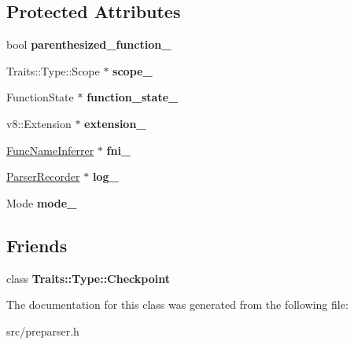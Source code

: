 \subsection*{Protected Attributes}
\begin{DoxyCompactItemize}
\item 
\hypertarget{classv8_1_1internal_1_1_parser_base_ae51f9a1c1a9a4397dcf7957f2ae1b348}{}bool {\bfseries parenthesized\+\_\+function\+\_\+}\label{classv8_1_1internal_1_1_parser_base_ae51f9a1c1a9a4397dcf7957f2ae1b348}

\item 
\hypertarget{classv8_1_1internal_1_1_parser_base_a3ded0984e6b6ee0cef1183384cba5996}{}Traits\+::\+Type\+::\+Scope $\ast$ {\bfseries scope\+\_\+}\label{classv8_1_1internal_1_1_parser_base_a3ded0984e6b6ee0cef1183384cba5996}

\item 
\hypertarget{classv8_1_1internal_1_1_parser_base_ad0a9d0aa2620fc65fa1a0580f3c68c6c}{}Function\+State $\ast$ {\bfseries function\+\_\+state\+\_\+}\label{classv8_1_1internal_1_1_parser_base_ad0a9d0aa2620fc65fa1a0580f3c68c6c}

\item 
\hypertarget{classv8_1_1internal_1_1_parser_base_a004e43fb3ddf202a42f3881f581e978b}{}v8\+::\+Extension $\ast$ {\bfseries extension\+\_\+}\label{classv8_1_1internal_1_1_parser_base_a004e43fb3ddf202a42f3881f581e978b}

\item 
\hypertarget{classv8_1_1internal_1_1_parser_base_a5fbaff026c27605f048cdfca5594d821}{}\hyperlink{classv8_1_1internal_1_1_func_name_inferrer}{Func\+Name\+Inferrer} $\ast$ {\bfseries fni\+\_\+}\label{classv8_1_1internal_1_1_parser_base_a5fbaff026c27605f048cdfca5594d821}

\item 
\hypertarget{classv8_1_1internal_1_1_parser_base_a147c6d2de26eb51162f8579310b3578e}{}\hyperlink{classv8_1_1internal_1_1_parser_recorder}{Parser\+Recorder} $\ast$ {\bfseries log\+\_\+}\label{classv8_1_1internal_1_1_parser_base_a147c6d2de26eb51162f8579310b3578e}

\item 
\hypertarget{classv8_1_1internal_1_1_parser_base_aa3c7c8dcd085ff11c9e374f9163b7983}{}Mode {\bfseries mode\+\_\+}\label{classv8_1_1internal_1_1_parser_base_aa3c7c8dcd085ff11c9e374f9163b7983}

\end{DoxyCompactItemize}
\subsection*{Friends}
\begin{DoxyCompactItemize}
\item 
\hypertarget{classv8_1_1internal_1_1_parser_base_aac1f54c68ccd21dc7a0dba56cd82519c}{}class {\bfseries Traits\+::\+Type\+::\+Checkpoint}\label{classv8_1_1internal_1_1_parser_base_aac1f54c68ccd21dc7a0dba56cd82519c}

\end{DoxyCompactItemize}


The documentation for this class was generated from the following file\+:\begin{DoxyCompactItemize}
\item 
src/preparser.\+h\end{DoxyCompactItemize}
